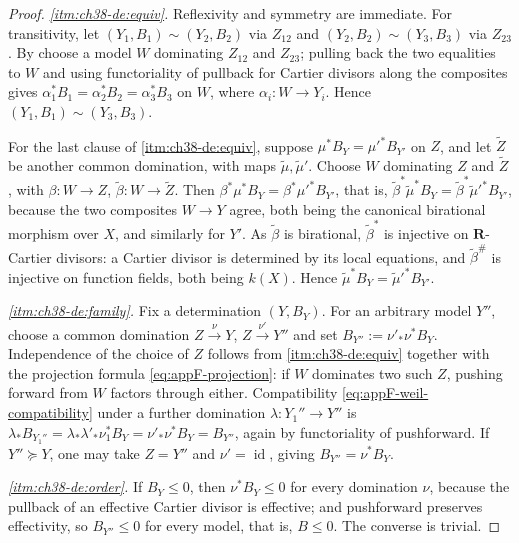 \begin{proof}
\emph{\cref{itm:ch38-de:equiv}.}  Reflexivity and symmetry are immediate.
For transitivity, let $(Y_1,B_1)\sim(Y_2,B_2)$ via $Z_{12}$ and
$(Y_2,B_2)\sim(Y_3,B_3)$ via $Z_{23}$.  By
 choose a model $W$ dominating
$Z_{12}$ and $Z_{23}$; pulling back the two equalities to $W$ and
using functoriality of pullback for Cartier divisors along the composites
gives $\alpha_1^*B_1=\alpha_2^*B_2=\alpha_3^*B_3$ on $W$, where
$\alpha_i:W\to Y_i$.  Hence $(Y_1,B_1)\sim(Y_3,B_3)$.

For the last clause of \cref{itm:ch38-de:equiv}, suppose
$\mu^*B_Y=\mu'^*B_{Y'}$ on $Z$, and let $\widetilde Z$ be another
common domination, with maps $\widetilde\mu,\widetilde\mu'$.  Choose
$W$ dominating $Z$ and $\widetilde Z$, with
$\beta:W\to Z$, $\widetilde\beta:W\to\widetilde Z$.  Then
$\beta^*\mu^*B_Y=\beta^*\mu'^*B_{Y'}$, that is,
$\widetilde\beta^*\widetilde\mu^*B_Y=\widetilde\beta^*\widetilde\mu'^*
B_{Y'}$, because the two composites $W\to Y$ agree, both being the
canonical birational morphism over $X$, and similarly for $Y'$.  As
$\widetilde\beta$ is birational, $\widetilde\beta^*$ is injective on
$\mathbf R$-Cartier divisors: a Cartier divisor is determined by its
local equations, and $\widetilde\beta^\#$ is injective on function
fields, both being $k(X)$.  Hence
$\widetilde\mu^*B_Y=\widetilde\mu'^*B_{Y'}$.

\emph{\cref{itm:ch38-de:family}.}  Fix a determination $(Y,B_Y)$.  For an
arbitrary model $Y''$, choose a common domination
$Z\xrightarrow{\nu}Y$, $Z\xrightarrow{\nu'}Y''$ and set
$B_{Y''}:=\nu'_*\nu^*B_Y$.  Independence of the choice of $Z$ follows
from \cref{itm:ch38-de:equiv} together with the projection formula
\eqref{eq:appF-projection}: if $W$ dominates two such $Z$, pushing
forward from $W$ factors through either.  Compatibility
\eqref{eq:appF-weil-compatibility} under a further domination
$\lambda:Y_1''\to Y''$ is
$\lambda_*B_{Y_1''}=\lambda_*\lambda'_*\nu_1^*B_Y=\nu'_*\nu^*B_Y=B_{Y''}$,
again by functoriality of pushforward.  If $Y''\succeq Y$, one may take
$Z=Y''$ and $\nu'=\operatorname{id}$, giving
$B_{Y''}=\nu^*B_Y$.

\emph{\cref{itm:ch38-de:order}.}  If $B_Y\leq0$, then
$\nu^*B_Y\leq0$ for every domination $\nu$, because the pullback of an
effective Cartier divisor is effective; and pushforward preserves
effectivity, so $B_{Y''}\leq0$ for every model, that is, $B\leq0$.  The
converse is trivial.
\end{proof}

